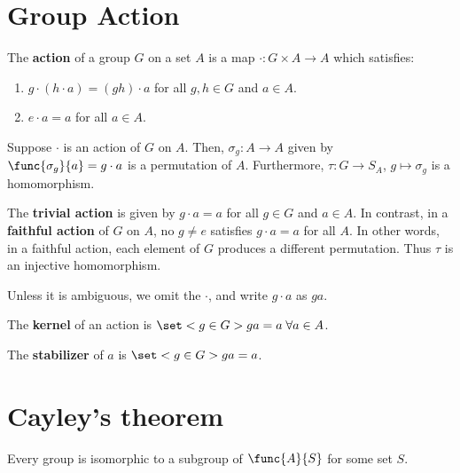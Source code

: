 \section{Group Action}
\begin{definition}
    The \textbf{action} of a group \(G\) on a set \(A\) is a map \(\cdot: G \times A \to A\) which satisfies:
    \begin{enumerate}
        \item \(g \cdot (h \cdot a) = (gh) \cdot a\) for all \(g,h \in G\) and \(a \in A\).
        \item \(e \cdot a  = a\) for all \(a \in A\).
    \end{enumerate}
\end{definition}

Suppose \(\cdot\) is an action of \(G\) on \(A\). Then, \(\sigma_g : A \to A\) given by \(\func{\sigma_g}{a} = g \cdot a\) is a permutation of \(A\). Furthermore, \(\tau : G \to S_A\), \(g \mapsto \sigma_g\) is a homomorphism.

\begin{example}
    The \textbf{trivial action} is given by \(g \cdot a = a\) for all \(g \in G\) and \(a \in A\). In contrast, in a \textbf{faithful action} of \(G\) on \(A\), no \(g \neq e\) satisfies \(g \cdot a = a\) for all \(A\). In other words, in a faithful action, each element of \(G\) produces a different permutation. Thus \(\tau\) is an injective homomorphism.
\end{example}

Unless it is ambiguous, we omit the \(\cdot\), and write \(g \cdot a\) as \(ga\).

\begin{definition}
    The \textbf{kernel} of an action is \(\set<g \in G>{ga = a \; \forall a \in A}\).
\end{definition}

\begin{definition}
    The \textbf{stabilizer} of \(a\) is \(\set<g \in G>{ga = a}\).
\end{definition}
\section{Cayley's theorem}
\begin{theorem}[Cayley]
    Every group is isomorphic to a subgroup of \(\func{A}{S}\) for some set \(S\).
\end{theorem}

